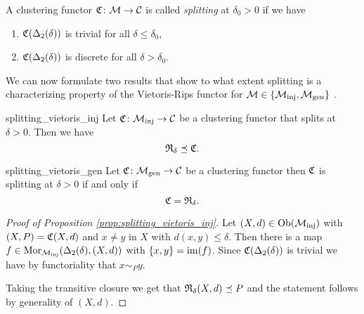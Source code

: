\begin{definition}{}{}
    A clustering functor $\mathfrak{C}\colon \mathcal{M} \to \mathcal{C}$ is called \emph{splitting} at $\delta_0 > 0$ if we have
    \begin{enumerate}
        \item $\mathfrak{C}(\Delta_2(\delta))$ is trivial for all $\delta \leq \delta_0$,
        \item $\mathfrak{C}(\Delta_2(\delta))$ is discrete for all $\delta > \delta_0$.
    \end{enumerate}
\end{definition}

We can now formulate two results that show to what extent splitting is a characterizing property of the Vietoris-Rips functor for $\mathcal{M} \in \{{\mathcal{M}_\mathrm{inj}}, {\mathcal{M}_\mathrm{gen}}\}$ \cite[Thm.~6.4]{Carlsson2010}.

\begin{proposition}{}{splitting_vietoris_inj}
    Let $\mathfrak{C}\colon {\mathcal{M}_\mathrm{inj}} \to \mathcal{C}$ be a clustering functor that splits at $\delta > 0$. Then we have 
    $$
    \mathfrak{R}_\delta \preceq \mathfrak{C}.
    $$
\end{proposition}


\begin{proposition}{}{splitting_vietoris_gen}
    Let $\mathfrak{C}\colon {\mathcal{M}_\mathrm{gen}} \to \mathcal{C}$ be a clustering functor then $\mathfrak{C}$ is splitting at $\delta > 0$ if and only if 
    $$
    \mathfrak{C} = \mathfrak{R}_\delta.
    $$
\end{proposition}

\begin{proof}[Proof of Proposition \ref{prop:splitting_vietoris_inj}]
    Let $(X,d) \in \mathrm {Ob}({\mathcal{M}_\mathrm{inj}})$ with $(X,P) = \mathfrak{C}(X,d)$ and $x \neq y$ in $X$ with $d(x,y) \leq \delta$.
    Then there is a map $f \in \mathrm {Mor}_{\mathcal{M}_\mathrm{inj}}(\Delta_2(\delta), (X,d))$ with $\{x,y\} = \operatorname*{im}(f)$.
    Since $\mathfrak{C}(\Delta_2(\delta))$ is trivial we have by functoriality that $x \sim_P y$.

    Taking the transitive closure we get that $\mathfrak{R}_\delta(X,d) \preceq P$ and the statement follows by generality of $(X,d)$.
\end{proof}

